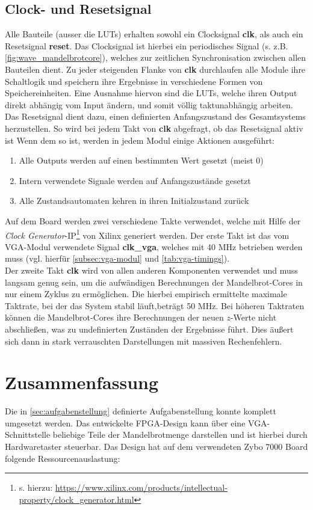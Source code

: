 \documentclass[a4paper,12pt,onesided]{report}
\begin{document}
\section{Clock- und Resetsignal}
Alle Bauteile (ausser die LUTs) erhalten sowohl ein Clocksignal \textbf{clk}, als auch ein Resetsignal \textbf{reset}.
Das Clocksignal ist hierbei ein periodisches Signal (s. z.B. \autoref{fig:wave_mandelbrotcore}), welches zur zeitlichen Synchronisation zwischen allen Bauteilen dient.
Zu jeder steigenden Flanke von \textbf{clk} durchlaufen alle Module ihre Schaltlogik und speichern ihre Ergebnisse in verschiedene Formen von Speichereinheiten.
Eine Ausnahme hiervon sind die LUTs, welche ihren Output direkt abhängig vom Input ändern, und somit völlig taktunabhängig arbeiten.\\
Das Resetsignal dient dazu, einen definierten Anfangszustand des Gesamtsystems herzustellen.
So wird bei jedem Takt von \textbf{clk} abgefragt, ob das Resetsignal aktiv ist
Wenn dem so ist, werden in jedem Modul einige Aktionen ausgeführt:
\begin{enumerate}
	\item Alle Outputs werden auf einen bestimmten Wert gesetzt (meist 0)
	\item Intern verwendete Signale werden auf Anfangszustände gesetzt
	\item Alle Zustandsautomaten kehren in ihren Initialzustand zurück
\end{enumerate}
Auf dem Board werden zwei verschiedene Takte verwendet, welche mit Hilfe der \textit{Clock Generator}-IP\footnote{s. hierzu: \url{https://www.xilinx.com/products/intellectual-property/clock_generator.html}} von Xilinx generiert werden.
Der erste Takt ist das vom VGA-Modul verwendete Signal \textbf{clk\_vga}, welches mit 40 MHz betrieben werden muss (vgl. hierfür \autoref{subsec:vga-modul} und \autoref{tab:vga-timings}).\\
Der zweite Takt \textbf{clk} wird von allen anderen Komponenten verwendet und muss langsam genug sein, um die aufwändigen Berechnungen der Mandelbrot-Cores in nur einem Zyklus zu ermöglichen.
Die hierbei empirisch ermittelte maximale Taktrate, bei der das System stabil läuft,beträgt 50 MHz.
Bei höheren Taktraten können die Mandelbrot-Cores ihre Berechnungen der neuen $z$-Werte nicht abschließen, was zu undefinierten Zuständen der Ergebnisse führt.
Dies äußert sich dann in stark verrauschten Darstellungen mit massiven Rechenfehlern.

\chapter{Zusammenfassung}
Die in \autoref{sec:aufgabenstellung} definierte Aufgabenstellung konnte komplett umgesetzt werden.
Das entwickelte FPGA-Design kann über eine VGA-Schnittstelle beliebige Teile der Mandelbrotmenge darstellen und ist hierbei durch Hardwaretaster steuerbar.
Das Design hat auf dem verwendeten Zybo 7000 Board folgende Ressourcenauslastung:
\end{document}

